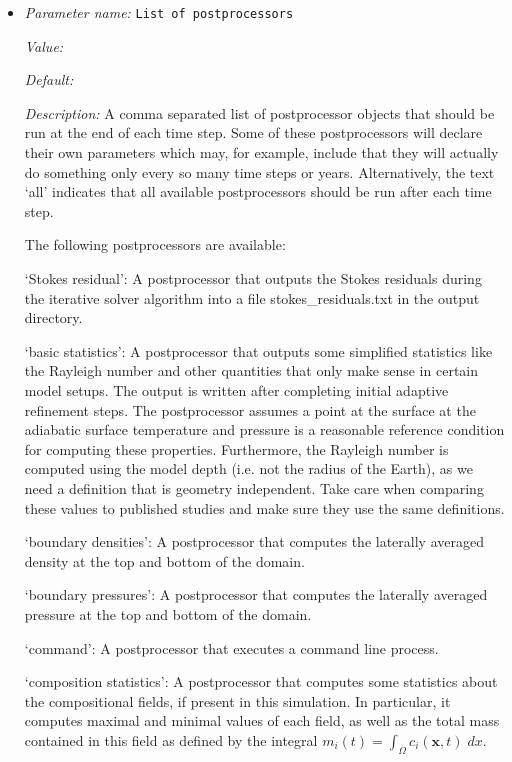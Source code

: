 \begin{itemize}
\item {\it Parameter name:} {\tt List of postprocessors}
\label{parameters:Postprocess/List of postprocessors}


{\it Value:} 


{\it Default:} 


{\it Description:} A comma separated list of postprocessor objects that should be run at the end of each time step. Some of these postprocessors will declare their own parameters which may, for example, include that they will actually do something only every so many time steps or years. Alternatively, the text `all' indicates that all available postprocessors should be run after each time step.

The following postprocessors are available:

`Stokes residual': A postprocessor that outputs the Stokes residuals during the iterative solver algorithm into a file stokes\_residuals.txt in the output directory.

`basic statistics': A postprocessor that outputs some simplified statistics like the Rayleigh number and other quantities that only make sense in certain model setups. The output is written after completing initial adaptive refinement steps. The postprocessor assumes a point at the surface at the adiabatic surface temperature and pressure is a reasonable reference condition for computing these properties. Furthermore, the Rayleigh number is computed using the model depth (i.e. not the radius of the Earth), as we need a definition that is geometry independent. Take care when comparing these values to published studies and make sure they use the same definitions.

`boundary densities': A postprocessor that computes the laterally averaged density at the top and bottom of the domain.

`boundary pressures': A postprocessor that computes the laterally averaged pressure at the top and bottom of the domain.

`command': A postprocessor that executes a command line process.

`composition statistics': A postprocessor that computes some statistics about the compositional fields, if present in this simulation. In particular, it computes maximal and minimal values of each field, as well as the total mass contained in this field as defined by the integral $m_i(t) = \int_\Omega c_i(\mathbf x,t) \; dx$.


\end{itemize}
